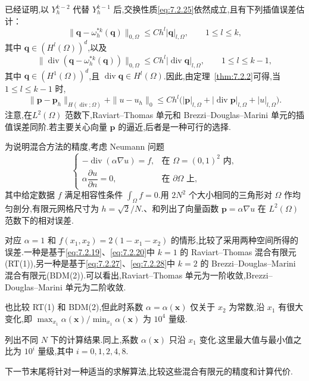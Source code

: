 已经证明,以 \(Y_h^{k-2}\) 代替 \(Y_h^{k-1}\) 后,交换性质\eqref{eq:7.2.25}依然成立,且有下列插值误差估计：
\[
  \|\boldsymbol{q}-\omega_h^{*k}(\boldsymbol{q})\|_{0,\Omega}\le Ch^l|\boldsymbol{q}|_{l,\Omega},
      \qquad 1\le l\le k,
\]
其中 \(\boldsymbol{q}\in(H^l(\Omega))^d\),以及
\[
  \|\operatorname{div}(\boldsymbol{q}-\omega_h^{*k}(\boldsymbol{q}))\|_{0,\Omega}
    \le Ch^l|\operatorname{div}\boldsymbol{q}|_{l,\Omega},\qquad 1\le l\le k-1,
\]
其中 \(\boldsymbol{q}\in(H^1(\Omega))^d\),且 \(\operatorname{div}\boldsymbol{q}\in H^l(\Omega)\).因此,由定理~\ref{thm:7.2.2}可得,当 \(1\le l\le k-1\) 时,
\begin{equation}\label{eq:7.2.29}
  \|\boldsymbol{p}-\boldsymbol{p}_h\|_{H(\operatorname{div};\Omega)}+\|u-u_h\|_0
    \le Ch^l\bigl(|\boldsymbol{p}|_{l,\Omega}+|\operatorname{div}\boldsymbol{p}|_{l,\Omega}+|u|_{l,\Omega}\bigr).
\end{equation}
注意,在\(L^2(\Omega)\) 范数下,Raviart--Thomas 单元和 Brezzi--Douglas--Marini 单元的插值误差同阶.若主要关心向量 \(\boldsymbol{p}\) 的逼近,后者是一种可行的选择.

\begin{example}[混合有限元的精度比较]\label{ex:7.2-neumann}
为说明混合方法的精度,考虑 Neumann 问题
\begin{equation}\label{eq:7.2.30}
  \begin{cases}
    -\operatorname{div}(\alpha\nabla u)=f,&\text{在 }\Omega=(0,1)^2\text{ 内},\\
    \alpha\dfrac{\partial u}{\partial n}=0,&\text{在 }\partial\Omega\text{ 上},
  \end{cases}
\end{equation}
其中给定数据 \(f\) 满足相容性条件 \(\int_\Omega f=0\).用 \(2N^2\) 个大小相同的三角形对 \(\Omega\) 作均匀剖分,有限元网格尺寸为 \(h=\sqrt 2/N\).、和列出了向量函数 \(\boldsymbol{p}=\alpha\nabla u\) 在 \(L^2(\Omega)\) 范数下的相对误差.

对应 \(\alpha=1\) 和 \(f(x_1,x_2)=2(1-x_1-x_2)\) 的情形,比较了采用两种空间所得的误差.一种是基于\eqref{eq:7.2.19}、\eqref{eq:7.2.20}中 \(k=1\) 的 Raviart--Thomas 混合有限元(RT(1)),另一种是基于\eqref{eq:7.2.27}、\eqref{eq:7.2.28}中 \(k=2\) 的 Brezzi--Douglas--Marini 混合有限元(BDM(2)).可以看出,Raviart--Thomas 单元为一阶收敛,Brezzi--Douglas--Marini 单元为二阶收敛.

也比较 RT(1) 和 BDM(2),但此时系数 \(\alpha=\alpha(\boldsymbol{x})\) 仅关于 \(x_2\) 为常数,沿 \(x_1\) 有很大变化,即 \(\max_{x_1}\alpha(\boldsymbol{x})/\min_{x_1}\alpha(\boldsymbol{x})\) 为 \(10^4\) 量级.

列出不同 \(N\) 下的计算结果.同上,系数 \(\alpha(\boldsymbol{x})\) 只沿 \(x_1\) 变化.这里最大值与最小值之比为 \(10^i\) 量级,其中 \(i=0,1,2,4,8\).

下一节末尾将针对一种适当的求解算法,比较这些混合有限元的精度和计算代价.
\end{example}

